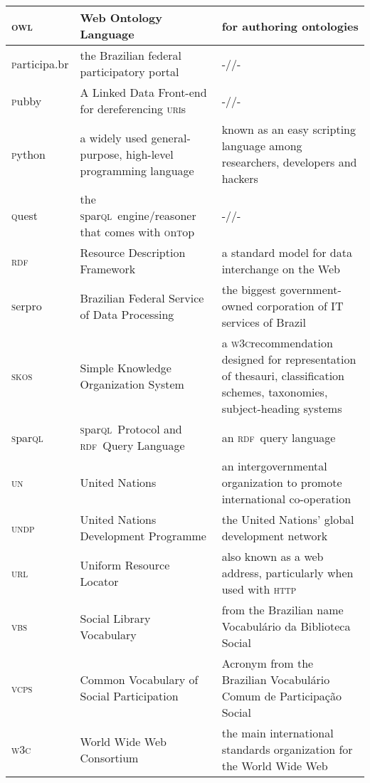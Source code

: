 \documentclass{article}
\newcommand{\vcps}{\textsc{vcps}}
\newcommand{\owl}{\textsc{owl}}
\newcommand{\sparql}{\textsc{s}par\textsc{ql}}
\newcommand{\wwwc}{\textsc{w3c}}
\newcommand{\skos}{\textsc{skos}}
\newcommand{\uri}{\textsc{uri}}
\newcommand{\urll}{\textsc{url}}
\newcommand{\http}{\textsc{http}}
\newcommand{\pubby}{\textsc{p}ubby}
\newcommand{\rdf}{\textsc{rdf}}
\newcommand{\participa}{\textsc{p}articipa.br}
\newcommand{\ontop}{\textsc{o}n\textsc{t}op}
\newcommand{\quest}{\textsc{q}uest}
\newcommand{\pnud}{\textsc{undp}}
\newcommand{\onu}{\textsc{un}}
\newcommand{\vbs}{\textsc{vbs}}
\newcommand{\serpro}{\textsc{s}erpro}
\newcommand{\python}{\textsc{p}ython}
\begin{document}
\begin{table}[!h]
\begin{tabular}{||l|p{5cm}|p{9cm}||}
      \owl  & Web Ontology Language & for authoring ontologies \\\hline
      \participa  & the Brazilian federal participatory portal & -//- \\\hline
      \pubby  & A Linked Data Front-end for dereferencing \uri s & -//- \\\hline
      \python  & a widely used general-purpose, high-level programming language & known as an easy scripting language among researchers, developers and hackers \\\hline
      \quest  & the \sparql\ engine/reasoner that comes with \ontop & -//- \\\hline
      \rdf  & Resource Description Framework & a standard model for data interchange on the Web \\\hline
      \serpro  & Brazilian Federal Service of Data Processing & the biggest government-owned corporation of IT services of Brazil \\\hline
      \skos  & Simple Knowledge Organization System & a \wwwc recommendation designed for representation of thesauri, classification schemes, taxonomies, subject-heading systems \\\hline
      \sparql  & \sparql\ Protocol and \rdf\ Query Language & an \rdf\ query language  \\\hline
      \onu  & United Nations & an intergovernmental organization to promote international co-operation \\\hline
      \pnud  & United Nations Development Programme & the United Nations' global development network \\\hline
      \urll  & Uniform Resource Locator & also known as a web address, particularly when used with \http \\\hline
      \vbs  & Social Library Vocabulary & from the Brazilian name Vocabulário da Biblioteca Social \\\hline
      \vcps  & Common Vocabulary of Social Participation & Acronym from the Brazilian Vocabul\'ario Comum de Participa\c{c}\~ao Social\\\hline
      \wwwc     & World Wide Web Consortium & the main international standards organization for the World Wide Web \\\hline
\end{tabular}
  \label{tab:glos}
\end{table}
\end{document}
